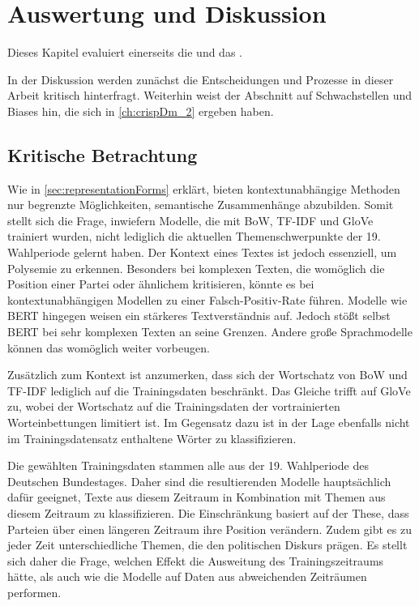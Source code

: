 \chapter{Auswertung und Diskussion} \label{ch:crispDm_3}

Dieses Kapitel evaluiert einerseits die  und das .

In der Diskussion werden zunächst die Entscheidungen und Prozesse in dieser Arbeit kritisch hinterfragt. Weiterhin weist der Abschnitt auf Schwachstellen und Biases hin, die sich in \autoref{ch:crispDm_2} ergeben haben.

\section{Kritische Betrachtung} \label{subsec:discussion}

Wie in \autoref{sec:representationForms} erklärt, bieten kontextunabhängige Methoden nur begrenzte Möglichkeiten, semantische Zusammenhänge abzubilden. Somit stellt sich die Frage, inwiefern Modelle, die mit \ac{BoW}, \ac{TF-IDF} und \ac{GloVe} trainiert wurden, nicht lediglich die aktuellen Themenschwerpunkte der 19. Wahlperiode gelernt haben. Der Kontext eines Textes ist jedoch essenziell, um Polysemie zu erkennen. Besonders bei komplexen Texten, die womöglich die Position einer Partei oder ähnlichem kritisieren, könnte es bei kontextunabhängigen Modellen zu einer Falsch-Positiv-Rate führen. Modelle wie \ac{BERT} hingegen weisen ein stärkeres Textverständnis auf. Jedoch stößt selbst \ac{BERT} bei sehr komplexen Texten an seine Grenzen. Andere große Sprachmodelle können das womöglich weiter vorbeugen.

Zusätzlich zum Kontext ist anzumerken, dass sich der Wortschatz von \ac{BoW} und \ac{TF-IDF} lediglich auf die Trainingsdaten beschränkt. Das Gleiche trifft auf \ac{GloVe} zu, wobei der Wortschatz auf die Trainingsdaten der vortrainierten Worteinbettungen limitiert ist. Im Gegensatz dazu ist \ft in der Lage ebenfalls nicht im Trainingsdatensatz enthaltene Wörter zu klassifizieren.

Die gewählten Trainingsdaten stammen alle aus der \num{19}. Wahlperiode des Deutschen Bundestages. Daher sind die resultierenden Modelle hauptsächlich dafür geeignet, Texte aus diesem Zeitraum in Kombination mit Themen aus diesem Zeitraum zu klassifizieren. Die Einschränkung basiert auf der These, dass Parteien über einen längeren Zeitraum ihre Position verändern. Zudem gibt es zu jeder Zeit unterschiedliche Themen, die den politischen Diskurs prägen. Es stellt sich daher die Frage, welchen Effekt die Ausweitung des Trainingszeitraums hätte, als auch wie die Modelle auf Daten aus abweichenden Zeiträumen performen.

